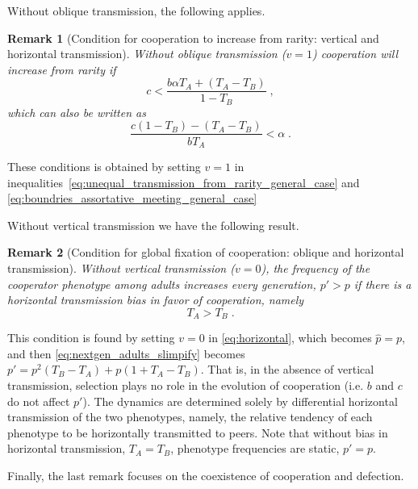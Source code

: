 \documentclass[12pt]{extarticle}
\newtheorem{remark}{Remark}
\begin{document}
Without oblique transmission, the following applies.
\\

\begin{remark}[Condition for cooperation to increase from rarity: vertical and horizontal transmission]
\label{remark:vert_hori}
Without oblique transmission ($v=1$) cooperation will increase from rarity if
\begin{equation} \label{eq:vert_hori}
c < \frac{b \alpha T_A + (T_A - T_B)}{1-T_B} \;,
\end{equation} 
which can also be written as
\begin{equation} \label{eq:vert_hori_alpha}
\frac{c (1-T_B)-(T_A-T_B)}{b T_A} < \alpha \;.
\end{equation}
\end{remark}

These conditions is obtained by setting $v=1$ in inequalities~\ref{eq:unequal_transmission_from_rarity_general_case} and \ref{eq:boundries_assortative_meeting_general_case}

Without vertical transmission we have the following result.
\\

\begin{remark}[Condition for global fixation of cooperation: oblique and horizontal transmission] \label{result:obli_hori}
Without vertical transmission ($v=0$), the frequency of the cooperator phenotype among adults increases every generation, $p'>p$ if there is a horizontal transmission bias in favor of cooperation, namely
\begin{equation} \label{eq:oblique_only_result}
T_A > T_B \;.
\end{equation}
\end{remark}

This condition is found by setting $v = 0$ in \autoref{eq:horizontal}, which becomes $\hat{p}=p$, and then \autoref{eq:nextgen_adults_slimpify} becomes 
$p' = p^2 (T_B-T_A) + p (1+T_A-T_B)$. 
That is, in the absence of vertical transmission, selection plays no role in the evolution of cooperation (i.e. $b$ and $c$ do not affect $p'$).
The dynamics are determined solely by differential horizontal transmission of the two phenotypes, namely, the relative tendency of each phenotype to be horizontally transmitted to peers.
Note that without bias in horizontal transmission, $T_A = T_B$, phenotype frequencies are static, $p'=p$.

Finally, the last remark focuses on the coexistence of cooperation and defection.
\\
\end{document}
